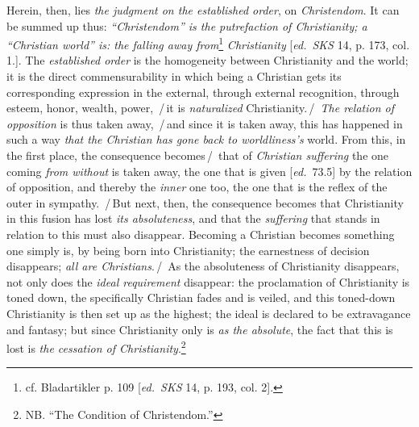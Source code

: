 \documentclass[12pt,a4paper,openany]{book}
\newcommand{\kpage}[1]{\marginnote{\footnotesize\textit{[#1]}}}
\newcommand{\ed}[1]{{\small[\textit{ed.}\ #1]}}
\newcommand{\ins}[1]{\,/\,#1\,/\,}
\begin{document}
Herein, then, lies \emph{the judgment on the established order}, on \emph{Christendom}. It can
be summed up thus: \emph{``Christendom'' is the putrefaction of Christianity;
a ``Christian world'' is: the falling away from}\footnote[99]{cf. Bladartikler p. 109 \ed{\emph{SKS} 14, p. 193, col. 2}.}
\emph{Christianity} \ed{\emph{SKS} 14, p. 173, col. 1.}.
The \emph{established order} is the homogeneity between Christianity and the world;
it is the direct commensurability in which being a Christian
gets its corresponding expression in the external, through external recognition,
through esteem, honor, wealth, power, \ins{it is \emph{naturalized} Christianity.}
\emph{The relation of opposition} is thus taken away, \ins{and since it is
taken away, this has happened in such a way \emph{that the Christian has gone back to worldliness's}
world. From this, in the first place, the consequence becomes}
that of \emph{Christian suffering} the one coming \emph{from without} is taken away, the one that is given \ed{73.5}
\kpage{158}by the relation of opposition, and thereby the \emph{inner} one too, the one that is
the reflex of the outer in sympathy. \ins{But next, then, the consequence becomes that
Christianity in this fusion has lost \emph{its absoluteness}, and
that the \emph{suffering} that stands in relation to this must also disappear. Becoming
a Christian becomes something one simply is, by being born
into Christianity; the earnestness of decision disappears; \emph{all are Christians}.}
As the absoluteness of Christianity disappears, not only does
the \emph{ideal requirement} disappear: the proclamation of Christianity is toned down,
the specifically Christian fades and is veiled, and this toned-down
Christianity is then set up as the highest; the ideal is declared to be
extravagance and fantasy; but since Christianity only
is \emph{as the absolute}, the fact that this is lost is \emph{the cessation of Christianity}.\footnote[100]{NB. ``The Condition of Christendom.''}
\end{document}

